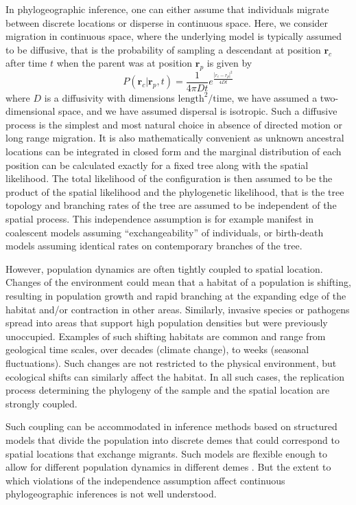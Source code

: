 \documentclass[aps,rmp, twocolumn]{revtex4}
\newcommand{\rvec}{\mathbf{r}}
\begin{document}
In phylogeographic inference, one can either assume that individuals migrate between discrete locations or disperse in continuous space.
Here, we consider migration in continuous space, where the underlying model is typically assumed to be diffusive, that is the probability of sampling a descendant at position $\rvec_c$ after time $t$ when the parent was at position $\rvec_p$ is given by
\begin{equation}
    P(\rvec_c| \rvec_p, t) = \frac{1}{4\pi D t}e^{\frac{|r_c - r_p|^2}{4Dt}}
\end{equation}
where $D$ is a diffusivity with dimensions $\mathrm{length}^2/\mathrm{time}$, we have assumed a two-dimensional space, and we have assumed dispersal is isotropic.
Such a diffusive process is the simplest and most natural choice in absence of directed motion or long range migration.
It is also mathematically convenient as unknown ancestral locations can be integrated in closed form and the marginal distribution of each position can be calculated exactly for a fixed tree along with the spatial likelihood.
The total likelihood of the configuration is then assumed to be the product of the spatial likelihood and the phylogenetic likelihood, that is the tree topology and branching rates of the tree are assumed to be independent of the spatial process.
This independence assumption is for example manifest in coalescent models assuming ``exchangeability'' of individuals, or birth-death models assuming identical rates on contemporary branches of the tree.

However, population dynamics are often tightly coupled to spatial location.
Changes of the environment could mean that a habitat of a population is shifting, resulting in population growth and rapid branching at the expanding edge of the habitat and/or contraction in other areas.
Similarly, invasive species or pathogens spread into areas that support high population densities but were previously unoccupied.
Examples of such shifting habitats are common and range from geological time scales, over decades (climate change), to weeks (seasonal fluctuations).
Such changes are not restricted to the physical environment, but ecological shifts can similarly affect the habitat.
In all such cases, the replication process determining the phylogeny of the sample and the spatial location are strongly coupled.

Such coupling can be accommodated in inference methods based on structured models that divide the population into discrete demes that could correspond to spatial locations that exchange migrants.
Such models are flexible enough to allow for different population dynamics in different demes \citep{vaughan_efficient_2014}.
But the extent to which violations of the independence assumption affect continuous phylogeographic inferences is not well understood.
\end{document}
